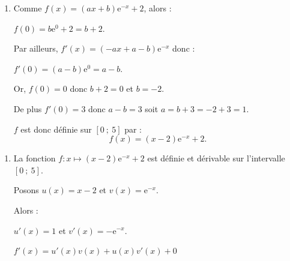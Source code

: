 \begin{corrige}
\begin{enumerate}
\begin{enumerate}
{               }
               \item %
               Comme $f(x)=(ax+b)\text{e}^{-x}+2$, alors :
               \par
               $f(0)=b\text{e}^{0}+2=b+2$.
               \par
               Par ailleurs, $f'(x)=(-ax+a-b)\text{e}^{-x}$ donc :
               \par
               $f'(0)=(a-b)\text{e}^{0}=a-b$.
               \par
               Or, $f(0)=0$ donc $b+2=0$ et $b=-2$.
               \par
               De plus $f'(0)=3$ donc $a-b=3$ soit ${a=b+3=-2+3=1}$.
               \par
               \par
               $f$ est donc définie sur $[0~;~5]$ par :
               \[ f(x)=(x-2)\text{e}^{-x}+2. \]
               \par
          \end{enumerate}
          \par
     \end{enumerate}
     \par
     \par
     \begin{enumerate}
          \item %
          La fonction $f : x \longmapsto (x-2)\text{e}^{-x}+2$ est définie et dérivable sur l'intervalle $[0~;~5]$.
          \par
          Posons $u(x)=x-2$ et $v(x)=\text{e}^{-x}$.
          \par
          Alors :
          \par
          $u'(x)=1$ et $v'(x)=-\text{e}^{-x}$.
          \par
          $f'(x)=u'(x)v(x)+u(x)v'(x) + 0$

\end{enumerate}
\end{corrige}
